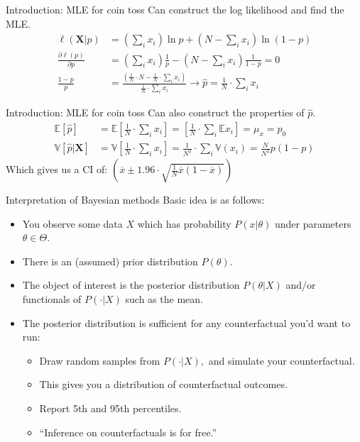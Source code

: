 \documentclass[aspectratio=169]{beamer}
\begin{document}
\begin{frame}{Introduction: MLE for coin toss}
Can construct the \alert{log likelihood} and find the MLE.
\begin{align*}
\ell(\mathbf{X} | p) &= (\sum_i  x_i ) \ln p + (N-\sum_i x_i) \ln (1-p)\\
\frac{\partial \ell(p) }{\partial p} &= (\sum_i  x_i ) \frac{1}{p} - (N-\sum_i x_i) \frac{1}{1-p} =0\\
\frac{1-p}{p}  &= \frac{(\frac{1}{N}\cdot N-\frac{1}{N}\cdot\sum_i x_i) }{\frac{1}{N}\cdot \sum_i x_i} \rightarrow \hat{p} = \frac{1}{N}\cdot \sum_i x_i
\end{align*}
\end{frame}


\begin{frame}{Introduction: MLE for coin toss}
Can also construct the properties of $\hat{p}$.
\begin{align*}
\mathbb{E}[\hat{p}] &= \mathbb{E} \left[ \frac{1}{N}\cdot \sum_i x_i \right]  = \left[ \frac{1}{N}\cdot \sum_i \mathbb{E} x_i \right]  = \mu_x = p_0\\
\mathbb{V}[\hat{p} | \mathbf{X}] &= \mathbb{V} \left[ \frac{1}{N}\cdot \sum_i x_i \right]  =  \frac{1}{N^2}\cdot \sum_i \mathbb{V} (x_i ) = \frac{N}{N^2} p (1-p)
\end{align*}
Which gives us a CI of:  $\left(\overline{x} \pm 1.96 \cdot \sqrt{\frac{1}{N} \overline{x} (1-\overline{x})} \right)$
\end{frame}

\begin{frame}{Interpretation of Bayesian methods}
Basic idea is as follows:
\begin{itemize}
\item You observe some data $X$ which has probability $P(x|\theta)$ under
parameters $\theta\in\Theta.$ 
\item There is an (assumed) \alert{prior distribution} $P(\theta).$
\item The object of interest is the \alert{posterior distribution } $P(\theta|X)$
and/or functionals of $P(\cdot|X)$ such as the mean.
\item The posterior distribution is sufficient for any counterfactual you'd
want to run:
\begin{itemize}
\item Draw random samples from $P(\cdot|X),$ and simulate your counterfactual.
\item This gives you a distribution of counterfactual outcomes.
\item Report 5th and 95th percentiles.
\item ``Inference on counterfactuals is for free.''
\end{itemize}
\end{itemize}
\end{frame}
\end{document}
